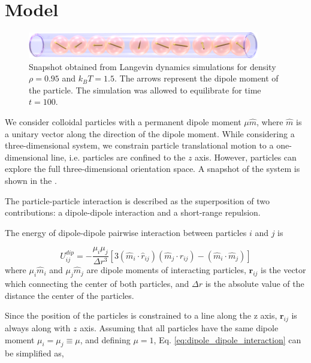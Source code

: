 \section{Model}
\label{sec:model}

\begin{figure}[t]
\centering
	\includegraphics[width=0.9\textwidth]{Images/fullSystemPicture}
	\captionsetup{justification=centering, width=0.9\textwidth}
	\caption{Snapshot obtained from Langevin dynamics simulations for density $\rho = 0.95$ and $k_BT = 1.5$. The arrows represent the dipole moment of the particle. The simulation was allowed to equilibrate for time $t = 100$.}
	\label{fig:fullSystemPicture}
\end{figure}

We consider colloidal particles with a permanent dipole moment $\mu \hat{m}$, where $\hat{m}$ is a unitary vector along the direction of the dipole moment. While considering a three-dimensional system, we constrain particle translational motion to a one-dimensional line, i.e. particles are confined to the $z$ axis. However, particles can explore the full three-dimensional orientation space. A snapshot of the system is shown in the .

The particle-particle interaction is described as the superposition of two contributions: a dipole-dipole interaction and a short-range repulsion.

The energy of dipole-dipole pairwise interaction between particles $i$ and $j$ is

\begin{equation}
\label{eq:dipole_dipole_interaction}
U^{dip}_{ij} =
	- \frac{\mu_i \mu_j}{\Delta r^3}[
		3 (\hat{m}_i \cdot \hat{r}_{ij})(\hat{m}_j \cdot \hat{r}_{ij})
		- (\hat{m}_i \cdot \hat{m}_j)
	]
\end{equation}
where $\mu_i \hat{m}_i$ and $\mu_j \hat{m}_j$ are dipole moments of interacting particles, $\boldsymbol{r}_{ij}$ is the vector which connecting the center of both particles, and $\Delta r$ is the absolute value of the distance the center of the particles.

Since the position of the particles is constrained to a line along the z axis, $\boldsymbol{r}_{ij}$ is always along with $z$ axis. Assuming that all particles have the same dipole moment $\mu_i = \mu_j \equiv \mu$, and defining $\mu = 1$, Eq. \eqref{eq:dipole_dipole_interaction} can be simplified as,

